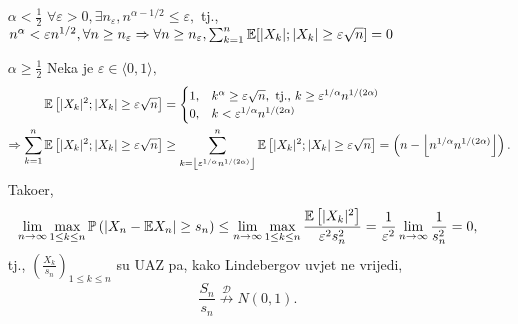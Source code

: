 \documentclass{article}
\begin{document}
\begin{enumerate}
    \item[\(\alpha<\frac12\)] \(\forall\varepsilon>0,\exists n_\varepsilon,n^{\alpha-1/2}\le\varepsilon,\) tj., \(n^\alpha<\varepsilon n^{1/2},\forall n\ge n_\varepsilon\Rightarrow\forall n\ge n_\varepsilon,\sum_{k=1}^n\Bbb E[|X_k|;|X_k|\ge\varepsilon\sqrt n]=0\) 
    \item[\(\alpha\ge\frac12\)] Neka je \(\varepsilon\in\langle0,1\rangle,\) \[\begin{aligned}\Bbb E\left[|X_k|^2;|X_k|\ge\varepsilon\sqrt n\right]&=\begin{cases}1,&k^\alpha\ge\varepsilon\sqrt n,\text{ tj., }k\ge\varepsilon^{1/\alpha}n^{1/(2\alpha)}\\0,&k<\varepsilon^{1/\alpha}n^{1/(2\alpha)}\end{cases}\\\Rightarrow\sum_{k=1}^n\Bbb E\left[|X_k|^2;|X_k|\ge\varepsilon\sqrt n\right]&\ge\sum_{k=\left\lfloor\varepsilon^{1/\alpha}n^{1/(2\alpha)}\right\rfloor}^n\Bbb E\left[|X_k|^2;|X_k|\ge\varepsilon\sqrt n\right]=\left(n-\left\lfloor n^{1/\alpha}n^{1/(2\alpha)}\right\rfloor\right).\end{aligned}\] Tako\dj{}er, \[\lim_{n\to\infty}\max_{1\le k\le n}\Bbb P\left(|X_n-\Bbb EX_n|\ge s_n\right)\le\lim_{n\to\infty}\max_{1\le k\le n}\frac{\Bbb E\left[|X_k|^2\right]}{\varepsilon^2s_n^2}=\frac1{\varepsilon^2}\lim_{n\to\infty}\frac1{s_n^2}=0,\] tj., \(\left(\frac{X_k}{s_n}\right)_{1\le k\le n}\) su UAZ pa, kako Lindebergov uvjet ne vrijedi, \[\frac{S_n}{s_n}\overset{\mathcal D}{\not\longrightarrow}N(0,1).\]
\end{enumerate}

\newpage
\end{document}
